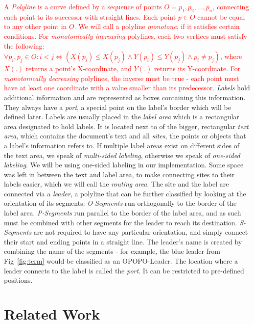 \documentclass[11pt,a4paper]{vutinfth}
\newcommand{\change}[1]{\textcolor{red}{#1}}
\begin{document}
\change{A \emph{Polyline} is a curve defined by a sequence of points $O=p_1, p_2, ...,p_n$, connecting each point to its successor with straight lines. Each point $p \in O$ cannot be equal to any other point in $O$.
We will call a polyline \emph{monotone}, if it satisfies certain conditions. For \emph{monotonically increasing} polylines, each two vertices must satisfy the following: \\
$\forall p_i, p_j \in O: i<j \iff (X(p_i)\leq X(p_j) \land Y(p_i)\leq Y(p_j)\land p_i \neq p_j)$, where $X(.)$ returns a point's X-coordinate, and $Y(.)$ returns its Y-coordinate. For \emph{monotonically decreasing} polylines, the inverse must be true - each point must have at least one coordinate with a value smaller than its predecessor.}
\emph{Labels} hold additional information and are represented as boxes containing this information. They always have a \emph{port}, a special point on the label's border which will be defined later. Labels are usually placed in the \emph{label area} which is a rectangular area designated to hold labels. It is located next to of the bigger, rectangular \emph{text area}, which contains the document's text and all \emph{sites}, the points or objects that a label's information refers to. If multiple label areas exist on different sides of the text area, we speak of \emph{multi-sided labeling}, otherwise we speak of \emph{one-sided labeling}. We will be using one-sided labeling in our implementation. Some space was left in between the text and label area, to make connecting sites to their labels easier, which we will call the \emph{routing area}. The site and the label are connected via a \emph{leader}, a polyline that can be further classified by looking at the orientation of its segments: \emph{O-Segments} run orthogonally to the border of the label area. \emph{P-Segments} run parallel to the border of the label area, and as such must be combined with other segments for the leader to reach its destination. \emph{S-Segments} are not required to have any particular orientation, and simply connect their start and ending points in a straight line.
The leader's name is created by combining the name of the segments - for example, the blue leader from Fig~\ref{fig:term} would be classified as an OPOPO-Leader.
The location where a leader connects to the label is called the \emph{port}. It can be restricted to pre-defined positions. %


\section{Related Work}
\end{document}
